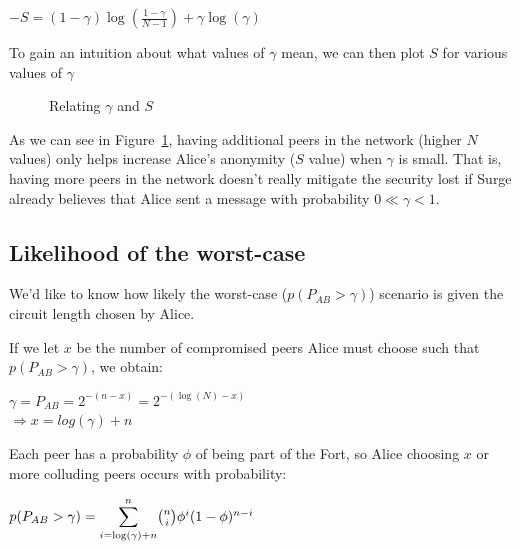 \documentclass[twocolumn,11pt,english]{article}
\begin{document}
\begin{center}
$-S = (1 - \gamma) \log(\frac{1-\gamma}{N - 1}) + \gamma \log(\gamma)$
\end{center}

To gain an intuition about what values of $\gamma$ mean, we can then plot $S$ for various values of $\gamma$
\begin{figure}[h!]
  \caption{Relating $\gamma$ and $S$}
  \label{gammaS}
\end{figure}

As we can see in Figure~\ref{gammaS}, having additional peers in the network (higher $N$ values) only helps increase Alice's anonymity ($S$ value) when $\gamma$ is small. That is, having more peers in the network doesn't really mitigate the security lost if Surge already believes that Alice sent a message with probability $0 \ll \gamma < 1 $. 

\subsection{Likelihood of the worst-case}
We'd like to know how likely the worst-case ($p(P_{AB} > \gamma)$) scenario is given the circuit length chosen by Alice. 

If we let $x$ be the number of compromised peers Alice must choose such that $p(P_{AB} > \gamma)$, we obtain: 
\begin{center}
$\gamma = P_{AB} = 2^{-(n - x)} = 2^{-(\log(N) - x)}$
\\ $ \Rightarrow x = log( \gamma ) + n$
\end{center}
Each peer has a probability $\phi$ of being part of the Fort, so Alice choosing $x$ or more colluding peers occurs with probability:
\begin{center}
 $p(P_{AB} > \gamma) = \mathlarger{\sum}\limits_{i=\log(\gamma) + n}^n {n \choose i} \phi^i (1 - \phi )^{n-i}$

\end{center}
\end{document}
